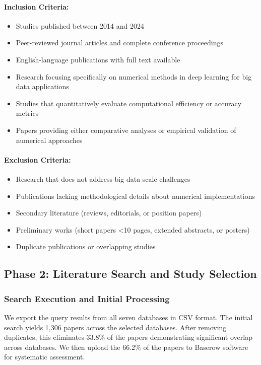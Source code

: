 \documentclass[acmsmall]{acmart}
\begin{document}
\noindent\paragraph{Inclusion Criteria:}
\begin{itemize}
    \item Studies published between 2014 and 2024
    \item Peer-reviewed journal articles and complete conference proceedings
    \item English-language publications with full text available
    \item Research focusing specifically on numerical methods in deep learning for big data applications
    \item Studies that quantitatively evaluate computational efficiency or accuracy metrics
    \item Papers providing either comparative analyses or empirical validation of numerical approaches
\end{itemize}

\noindent\paragraph{Exclusion Criteria:}
\begin{itemize}
    \item Research that does not address big data scale challenges
    \item Publications lacking methodological details about numerical implementations
    \item Secondary literature (reviews, editorials, or position papers)
    \item Preliminary works (short papers <10 pages, extended abstracts, or posters)
    \item Duplicate publications or overlapping studies
\end{itemize}


\subsection{Phase 2: Literature Search and Study Selection}\label{subsec:phase-2-literature-search-and-study-selection}
\subsubsection{Search Execution and Initial Processing}\label{subsubsec:phase-2-literature-search-and-study-selection:search-execution-and-initial-processing}
We export the query results from all seven databases in CSV format. The initial search yields 1,306 papers across the selected databases. After removing duplicates, this eliminates 33.8\% of the papers demonstrating significant overlap across databases. We then upload the 66.2\% of the papers to Baserow software for systematic assessment.
\end{document}

